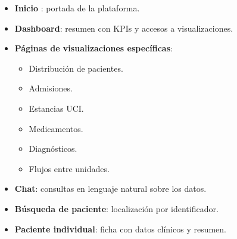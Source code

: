 \begin{itemize}
  \item \textbf{Inicio }: portada de la plataforma.
  \item \textbf{Dashboard}: resumen con KPIs y accesos a visualizaciones.
  \item \textbf{Páginas de visualizaciones específicas}:
  \begin{itemize}
    \item Distribución de pacientes.
    \item Admisiones.
    \item Estancias UCI.
    \item Medicamentos.
    \item Diagnósticos.
    \item Flujos entre unidades.
  \end{itemize}
  \item \textbf{Chat}: consultas en lenguaje natural sobre los datos.
  \item \textbf{Búsqueda de paciente}: localización por identificador.
  \item \textbf{Paciente individual}: ficha con datos clínicos y resumen.
\end{itemize}

